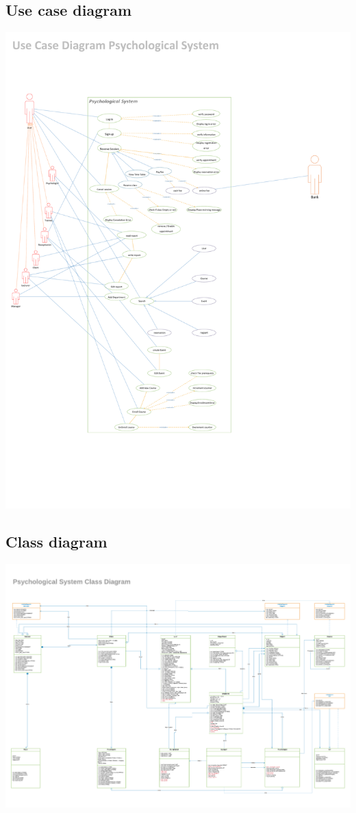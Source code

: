 \documentclass[../Psychological_system_web_application.tex]{subfiles}
\begin{document}
					
				\subsection{Use case diagram}
					\includegraphics[width=\textwidth ,height=0.9\textheight ,scale=4]{Diagrams/use_case_psychological_system.pdf}
					
				\subsection{Class diagram}
					\includegraphics[width=\textwidth ,height=0.9\textheight ,scale=4]{Diagrams/Class_Diagram_for_Psychological_System.pdf}	
					
\end{document}

